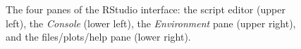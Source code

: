 \begin{figure}[H]
\caption{The four panes of the \textsf{RStudio} interface: the script editor
(upper left), the \emph{Console} (lower left), the \emph{Environment} pane
(upper right), and the files/plots/help pane (lower right).}
\label{fig:rstudio}
\end{figure}